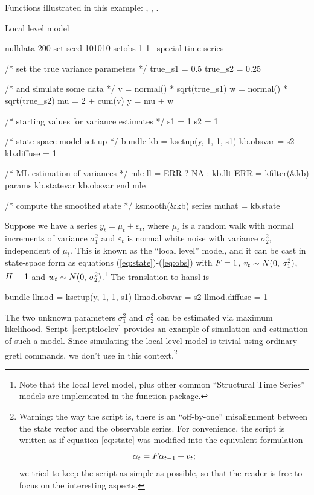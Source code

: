 Functions illustrated in this example: , ,
.

\begin{script}[htbp]
  \caption{Local level model}
  \label{script:loclev}
\begin{scode}
nulldata 200
set seed 101010
setobs 1 1 --special-time-series

/* set the true variance parameters */
true_s1 = 0.5
true_s2 = 0.25

/* and simulate some data */
v = normal() * sqrt(true_s1)
w = normal() * sqrt(true_s2)
mu = 2 + cum(v)
y = mu + w

/* starting values for variance estimates */
s1 = 1
s2 = 1

/* state-space model set-up */
bundle kb = ksetup(y, 1, 1, s1)
kb.obsvar = s2
kb.diffuse = 1

/* ML estimation of variances */
mle ll = ERR ? NA : kb.llt
    ERR = kfilter(&kb)
    params kb.statevar kb.obsvar
end mle

/* compute the smoothed state */
ksmooth(&kb)
series muhat = kb.state
\end{scode}
\end{script}

Suppose we have a series $y_t = \mu_t + \varepsilon_t$, where $\mu_t$
is a random walk with normal increments of variance $\sigma^2_1$ and
$\varepsilon_t$ is normal white noise with variance $\sigma^2_2$,
independent of $\mu_t$. This is known as the ``local level'' model,
and it can be cast in state-space form as equations
(\ref{eq:state})-(\ref{eq:obs}) with $F = 1$, $v_t \sim
N(0,\, \sigma^2_1)$, $H = 1$ and $w_t \sim N(0,\,
\sigma^2_2)$.\footnote{Note that the local level model, plus other
  common ``Structural Time Series'' models are implemented in the
   function package.} The translation to \textsf{hansl}
is 
\begin{code}
bundle llmod = ksetup(y, 1, 1, s1)
llmod.obsvar = s2
llmod.diffuse = 1
\end{code}

The two unknown parameters $\sigma^2_1$ and $\sigma^2_2$ can be
estimated via maximum likelihood.  Script~\ref{script:loclev} provides
an example of simulation and estimation of such a model. Since
simulating the local level model is trivial using ordinary gretl
commands, we don't use  in this context.\footnote{Warning:
  the way the script is, there is an ``off-by-one'' misalignment
  between the state vector and the observable series. For convenience,
  the script is written as if equation \eqref{eq:state} was modified
  into the equivalent formulation
  \[
  \alpha_{t} = F \alpha_{t-1} + v_t ;
  \]
  we tried to keep the script as simple as possible, so that the
  reader is free to focus on the interesting aspects. }

